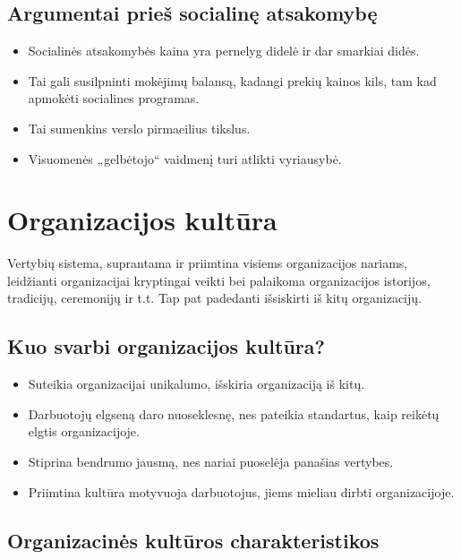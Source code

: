 \section{Argumentai prieš socialinę atsakomybę}

\begin{itemize}
  \item Socialinės atsakomybės kaina yra pernelyg didelė ir dar smarkiai
    didės.
  \item Tai gali susilpninti mokėjimų balansą, kadangi prekių kainos kils,
    tam kad apmokėti socialines programas.
  \item Tai sumenkins verslo pirmaeilius tikslus.
  \item Visuomenės „gelbėtojo“ vaidmenį turi atlikti vyriausybė.
\end{itemize}

\chapter{Organizacijos kultūra}

\begin{defn}
  Vertybių sistema, suprantama ir priimtina visiems organizacijos
  nariams, leidžianti organizacijai kryptingai veikti bei palaikoma
  organizacijos istorijos, tradicijų, ceremonijų ir t.t. Tap pat
  padedanti išsiskirti iš kitų organizacijų.
\end{defn}

\section{Kuo svarbi organizacijos kultūra?}

\begin{itemize}
  \item Suteikia organizacijai unikalumo, išskiria organizaciją iš kitų.
  \item Darbuotojų elgseną daro nuoseklesnę, nes pateikia standartus,
    kaip reikėtų elgtis organizacijoje.
  \item Stiprina bendrumo jausmą, nes nariai puoselėja panašias vertybes.
  \item Priimtina kultūra motyvuoja darbuotojus, jiems mieliau dirbti
    organizacijoje.
\end{itemize}

\section{Organizacinės kultūros charakteristikos}

